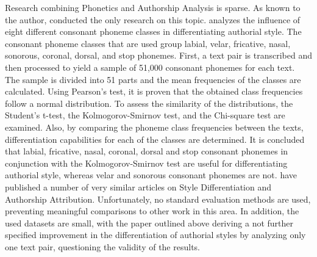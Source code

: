 Research combining Phonetics and Authorship Analysis is sparse.
As known to the author, \citeauthor{khomytska2019nonparametric} conducted the only research on this topic.
\cite{khomytska2019nonparametric} analyzes the influence of eight different consonant phoneme classes in differentiating authorial style.
The consonant phoneme classes that are used group labial, velar, fricative, nasal, sonorous, coronal, dorsal, and stop phonemes.
First, a text pair is transcribed and then processed to yield a sample of 51,000 consonant phonemes for each text.
The sample is divided into 51 parts and the mean frequencies of the classes are calculated.
Using Pearson's test, it is proven that the obtained class frequencies follow a normal distribution.
To assess the similarity of the distributions, the Student's t-test, the Kolmogorov-Smirnov test, and the Chi-square test are examined.
Also, by comparing the phoneme class frequencies between the texts, differentiation capabilities for each of the classes are determined.
It is concluded that labial, fricative, nasal, coronal, dorsal and  stop consonant phonemes in conjunction with the Kolmogorov-Smirnov test are useful for differentiating authorial style, whereas velar and sonorous consonant phonemes are not.
\citeauthor{khomytska2019nonparametric} have published a number of very similar articles on Style Differentiation and Authorship Attribution.
Unfortunately, no standard evaluation methods are used, preventing meaningful comparisons to other work in this area.
In addition, the used datasets are small, with the paper outlined above deriving a not further specified improvement in the differentiation of authorial styles by analyzing only one text pair, questioning the validity of the results.\\

